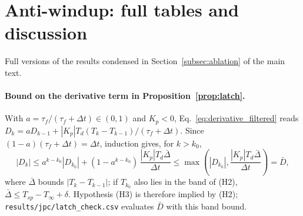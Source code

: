 \documentclass[11pt]{article}
\begin{document}
\section{Anti-windup: full tables and discussion}\label{supp:aw}
Full versions of the results condensed in Section~\ref{subsec:ablation} of the main text.

\paragraph{Bound on the derivative term in Proposition~\ref{prop:latch}.} With $a = \tau_f/(\tau_f + \Delta t) \in (0, 1)$ and $K_p < 0$, Eq.~\eqref{eq:derivative_filtered} reads $D_k = a D_{k-1} + |K_p|T_d(T_k - T_{k-1})/(\tau_f + \Delta t)$. Since $(1-a)(\tau_f + \Delta t) = \Delta t$, induction gives, for $k > k_0$,
\begin{equation}
    |D_k| \le a^{k-k_0}|D_{k_0}| + (1 - a^{k-k_0})\,\frac{|K_p| T_d \bar\Delta}{\Delta t} \le \max\!\left(|D_{k_0}|, \frac{|K_p| T_d \bar\Delta}{\Delta t}\right) = \bar D,
    \label{eq:dbar}
\end{equation}
where $\bar\Delta$ bounds $|T_k - T_{k-1}|$; if $T_{k_0}$ also lies in the band of (H2), $\bar\Delta \le T_{sp} - T_\infty + \delta$. Hypothesis (H3) is therefore implied by (H2); \texttt{results/jpc/latch\_check.csv} evaluates $\bar D$ with this band bound.




\end{document}
